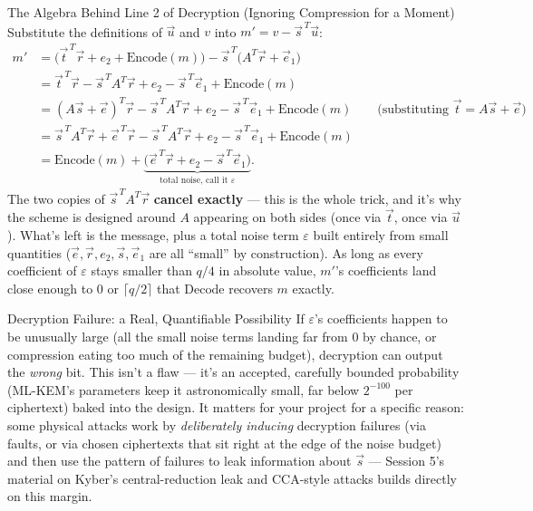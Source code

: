 \begin{rmkbox}{The Algebra Behind Line 2 of Decryption (Ignoring Compression for a Moment)}
Substitute the definitions of $\vec u$ and $v$ into $m' = v - \vec s^{\,T}\vec u$:
\begin{align*}
m' &= \big(\vec t^{\,T}\vec r + e_2 + \mathrm{Encode}(m)\big) - \vec s^{\,T}\big(A^T\vec r + \vec e_1\big) \\
&= \vec t^{\,T}\vec r - \vec s^{\,T}A^T\vec r + e_2 - \vec s^{\,T}\vec e_1 + \mathrm{Encode}(m) \\
&= (A\vec s + \vec e)^T \vec r - \vec s^{\,T}A^T\vec r + e_2 - \vec s^{\,T}\vec e_1 + \mathrm{Encode}(m) \qquad \text{(substituting } \vec t = A\vec s+\vec e\text{)}\\
&= \vec s^{\,T}A^T\vec r + \vec e^{\,T}\vec r - \vec s^{\,T}A^T\vec r + e_2 - \vec s^{\,T}\vec e_1 + \mathrm{Encode}(m) \\
&= \mathrm{Encode}(m) + \underbrace{\big(\vec e^{\,T}\vec r + e_2 - \vec s^{\,T}\vec e_1\big)}_{\text{total noise, call it } \varepsilon}.
\end{align*}
The two copies of $\vec s^{\,T}A^T\vec r$ \textbf{cancel exactly} --- this is the whole trick, and it's why the scheme is designed around $A$ appearing on both sides (once via $\vec t$, once via $\vec u$). What's left is the message, plus a total noise term $\varepsilon$ built entirely from small quantities ($\vec e, \vec r, e_2, \vec s, \vec e_1$ are all ``small'' by construction). As long as every coefficient of $\varepsilon$ stays smaller than $q/4$ in absolute value, $m'$'s coefficients land close enough to $0$ or $\lceil q/2\rceil$ that $\mathrm{Decode}$ recovers $m$ exactly.
\end{rmkbox}

\begin{rmkbox}{Decryption Failure: a Real, Quantifiable Possibility}
If $\varepsilon$'s coefficients happen to be unusually large (all the small noise terms landing far from $0$ by chance, or compression eating too much of the remaining budget), decryption can output the \emph{wrong} bit. This isn't a flaw --- it's an accepted, carefully bounded probability (ML-KEM's parameters keep it astronomically small, far below $2^{-100}$ per ciphertext) baked into the design. It matters for your project for a specific reason: some physical attacks work by \emph{deliberately inducing} decryption failures (via faults, or via chosen ciphertexts that sit right at the edge of the noise budget) and then use the pattern of failures to leak information about $\vec s$ --- Session 5's material on Kyber's central-reduction leak and CCA-style attacks builds directly on this margin.
\end{rmkbox}


